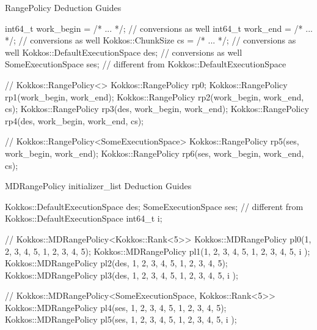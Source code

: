
\begin{frame}[fragile]{RangePolicy Deduction Guides}

\begin{code}[keywords={RangePolicy}]

int64_t work_begin   = /* ... */;  // conversions as well
int64_t work_end     = /* ... */;  // conversions as well
Kokkos::ChunkSize cs = /* ... */;  // conversions as well
Kokkos::DefaultExecutionSpace des; // conversions as well
SomeExecutionSpace ses;            // different from Kokkos::DefaultExecutionSpace

// Kokkos::RangePolicy<>
Kokkos::RangePolicy rp0;
Kokkos::RangePolicy rp1(work_begin, work_end);
Kokkos::RangePolicy rp2(work_begin, work_end, cs);
Kokkos::RangePolicy rp3(des, work_begin, work_end);
Kokkos::RangePolicy rp4(des, work_begin, work_end, cs);

// Kokkos::RangePolicy<SomeExecutionSpace>
Kokkos::RangePolicy rp5(ses, work_begin, work_end);
Kokkos::RangePolicy rp6(ses, work_begin, work_end, cs);

\end{code}

\end{frame}


\begin{frame}[fragile]{MDRangePolicy initializer\_list Deduction Guides}

\begin{code}[keywords={MDRangePolicy initializer_list}]

Kokkos::DefaultExecutionSpace des;
SomeExecutionSpace ses;            // different from Kokkos::DefaultExecutionSpace
int64_t i;

// Kokkos::MDRangePolicy<Kokkos::Rank<5>>
Kokkos::MDRangePolicy pl0({1, 2, 3, 4, 5}, {1, 2, 3, 4, 5});
Kokkos::MDRangePolicy pl1({1, 2, 3, 4, 5}, {1, 2, 3, 4, 5}, { i });
Kokkos::MDRangePolicy pl2(des, {1, 2, 3, 4, 5}, {1, 2, 3, 4, 5});
Kokkos::MDRangePolicy pl3(des, {1, 2, 3, 4, 5}, {1, 2, 3, 4, 5}, { i });

// Kokkos::MDRangePolicy<SomeExecutionSpace, Kokkos::Rank<5>>
Kokkos::MDRangePolicy pl4(ses, {1, 2, 3, 4, 5}, {1, 2, 3, 4, 5});
Kokkos::MDRangePolicy pl5(ses, {1, 2, 3, 4, 5}, {1, 2, 3, 4, 5}, { i });

\end{code}

\end{frame}

